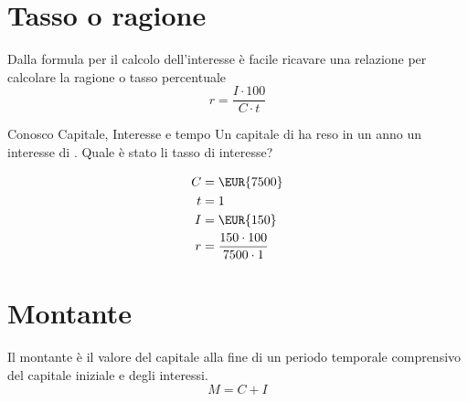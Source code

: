 \section{Tasso o ragione}
Dalla formula per il calcolo dell'interesse è facile ricavare una relazione per calcolare la ragione o tasso percentuale
\[r=\dfrac{I\cdot 100}{C\cdot t}\]
	\begin{esempiot}{Conosco Capitale, Interesse e tempo}{}
	Un capitale di  ha reso in un anno un interesse di . Quale è stato li tasso di interesse?
\end{esempiot}
\begin{align*}
	C={}&\mbox{\EUR{7500}}\\
	t={}&1\\
	I={}&\mbox{\EUR{150}}\\
	r={}&\dfrac{150\cdot 100}{7500\cdot 1}\\
\end{align*}
\section{Montante}
Il montante è il valore del capitale alla fine di un periodo temporale comprensivo del capitale iniziale e degli interessi.
\[M=C+I\]